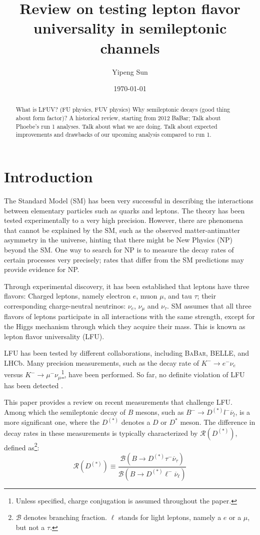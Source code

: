 \documentclass[12pt,letterpaper]{article}
\title{Review on testing lepton flavor universality in semileptonic channels}
\author{Yipeng Sun}
\affil{Department of Physics, University of Maryland}
\date{\today}
\def\BaBar/{\textsc{BaBar}}
\def\RDDst/{\ensuremath{\mathcal{R}(D^{(*)})}}
\begin{document}
\maketitle

\begin{abstract}
    What is LFUV? (FU physics, FUV physics)
    Why semileptonic decays (good thing about form factor)?
    A historical review, starting from 2012 BaBar;
    Talk about Phoebe's run 1 analyses.
    Talk about what we are doing.
    Talk about expected improvements and drawbacks of our upcoming analysis compared
    to run 1.
\end{abstract}

\section{Introduction}
The Standard Model (SM) has been very successful in describing the interactions
between elementary particles such as quarks and leptons.
The theory has been tested experimentally to a very high precision.
However, there are phenomena that cannot be explained by the SM, such as
the observed matter-antimatter asymmetry in the universe, hinting that there might be New Physics (NP) beyond the SM.
One way to search for NP is to measure the decay rates of certain processes
very precisely;
rates that differ from the SM predictions may provide evidence for NP.

Through experimental discovery, it has been established that leptons have three
flavors:
Charged leptons, namely electron $e$, muon $\mu$, and tau $\tau$;
their corresponding charge-neutral neutrinos: $\nu_e$, $\nu_\mu$ and $\nu_\tau$.
SM assumes that all three flavors of leptons participate in all
interactions with the same strength, except for the Higgs mechanism through which
they acquire their mass.
This is known as lepton flavor universality (LFU).

LFU has been tested by different collaborations, including \BaBar/, BELLE, and LHCb.
Many precision measurements, such as the decay rate
of $K^- \rightarrow e^- \nu_e$ versus $K^- \rightarrow \mu^- \nu_\mu$\footnote{
    Unless specified, charge conjugation is assumed throughout the paper.
}, have been performed.
So far, no definite violation of LFU has been detected \cite{Ciezarek:2017yzh}.

This paper provides a review on recent measurements that challenge LFU.
Among which the semileptonic decay of $B$ mesons, such as
$B^- \rightarrow D^{(*)} l^- \overline{\nu}_l$, is a more significant one, where the $D^{(*)}$ denotes a $D$ or $D^*$ meson.
The difference in decay rates in these measurements is typically characterized by \RDDst/,
defined as\footnote{
    $\mathcal{B}$ denotes branching fraction.
    $\ell$ stands for light leptons, namely a $e$ or a $\mu$, but not a $\tau$.
}:
\begin{equation}
    \RDDst/ \equiv \frac{
        \mathcal{B}\left(
            B \rightarrow D^{(*)} \tau^- \overline{\nu}_\tau
        \right)
    }{
        \mathcal{B}\left(
            B \rightarrow D^{(*)} \ell^- \overline{\nu}_\ell
        \right)
    }
\end{equation}
\end{document}
